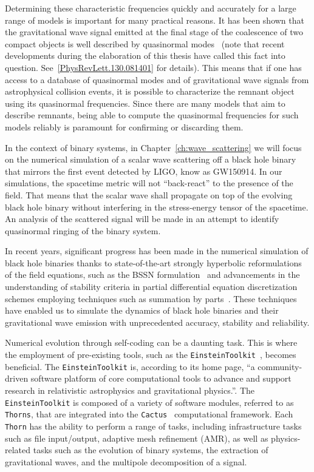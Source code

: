 Determining these characteristic frequencies quickly and accurately for a large range of models is important for many practical reasons. It has been shown that the gravitational wave signal emitted at the final stage of the coalescence of two compact objects is well described by quasinormal modes~\cite{buonanno,seidel} (note that recent developments during the elaboration of this thesis have called this fact into question. See~\ref{PhysRevLett.130.081401} for details). This means that if one has access to a database of quasinormal modes and of gravitational wave signals from astrophysical collision events, it is possible to characterize the remnant object using its quasinormal frequencies. Since there are many models that aim to describe remnants, being able to compute the quasinormal frequencies for such models reliably is paramount for confirming or discarding them.

In the context of binary systems, in Chapter~\ref{ch:wave_scattering} we will focus on the numerical simulation of a scalar wave scattering off a black hole binary that mirrors the first event detected by LIGO, know as GW150914. In our simulations, the spacetime metric will not ``back-react'' to the presence of the field. That means that the scalar wave shall propagate on top of the evolving black hole binary without interfering in the stress-energy tensor of the spacetime. An analysis of the scattered signal will be made in an attempt to identify quasinormal ringing of the binary system.

In recent years, significant progress has been made in the numerical simulation of black hole binaries thanks to state-of-the-art strongly hyperbolic reformulations of the field equations, such as the BSSN formulation~\cite{PhysRevD.52.5428,PhysRevD.59.024007} and advancements in the understanding of stability criteria in partial differential equation discretization schemes employing techniques such as summation by parts~\cite{Diener2007}. These techniques have enabled us to simulate the dynamics of black hole binaries and their gravitational wave emission with unprecedented accuracy, stability and reliability.

Numerical evolution through self-coding can be a daunting task. This is where the employment of pre-existing tools, such as the \texttt{EinsteinToolkit}~\cite{EinsteinToolkit:2022_11}, becomes beneficial. The \texttt{EinsteinToolkit} is, according to its home page, ``a community-driven software platform of core computational tools to advance and support research in relativistic astrophysics and gravitational physics.''. The \texttt{EinsteinToolkit} is composed of a variety of software modules, referred to as \texttt{Thorns}, that are integrated into the \texttt{Cactus}~\cite{Goodale:2002a} computational framework. Each \texttt{Thorn} has the ability to perform a range of tasks, including infrastructure tasks such as file input/output, adaptive mesh refinement (AMR), as well as physics-related tasks such as the evolution of binary systems, the extraction of gravitational waves, and the multipole decomposition of a signal.

